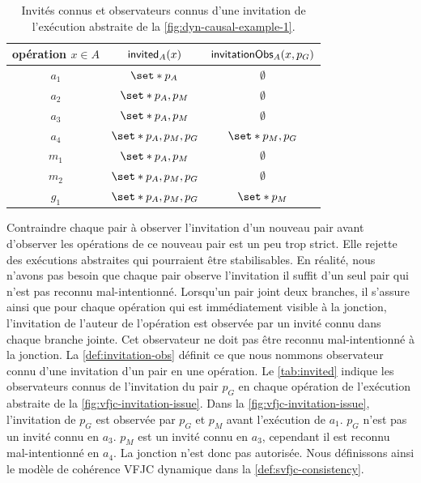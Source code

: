 \begin{table}[htb]
    \centering
    \begin{tabular}{ccc}
        opération $x \in A$ & $\operatorname{\mathsf{invited}}_A(x)$ & $\operatorname{\mathsf{invitationObs}}_A(x,p_G)$ \\
        \toprule
        $a_1$ & $\set*{p_A}$ & $\emptyset$ \\
        $a_2$ & $\set*{p_A, p_M}$ & $\emptyset$ \\
        $a_3$ & $\set*{p_A, p_M}$ & $\emptyset$ \\
        $a_4$ & $\set*{p_A, p_M,p_G}$ & $\set*{p_M,p_G}$\\
        $m_1$ & $\set*{p_A, p_M}$ & $\emptyset$ \\
        $m_2$ & $\set*{p_A, p_M,p_G}$ & $\emptyset$ \\
        $g_1$ & $\set*{p_A, p_M,p_G}$ & $\set*{p_M}$ \\
    \end{tabular}
    \caption[Invités connus et observateurs connus d'une invitation]{Invités connus et observateurs connus d'une invitation de l'exécution abstraite de la \autoref{fig:dyn-causal-example-1}.}\label{tab:invited}
\end{table}

Contraindre chaque pair à observer l'invitation d'un nouveau pair avant d'observer les opérations de ce nouveau pair est un peu trop strict.
Elle rejette des exécutions abstraites qui pourraient être stabilisables.
En réalité, nous n'avons pas besoin que chaque pair observe l'invitation il suffit d'un seul pair qui n'est pas reconnu mal-intentionné.
Lorsqu'un pair joint deux branches, il s'assure ainsi que pour chaque opération qui est immédiatement visible à la jonction, l'invitation de l'auteur de l'opération est observée par un invité connu dans chaque branche jointe.
Cet observateur ne doit pas être reconnu mal-intentionné à la jonction.
La \autoref{def:invitation-obs} définit ce que nous nommons observateur connu d'une invitation d'un pair en une opération.
Le \autoref{tab:invited} indique les observateurs connus de l'invitation du pair $p_G$ en chaque opération de l'exécution abstraite de la \autoref{fig:vfjc-invitation-issue}.
Dans la \autoref{fig:vfjc-invitation-issue}, l'invitation de $p_G$ est observée par $p_G$ et $p_M$ avant l'exécution de $a_1$.
$p_G$ n'est pas un invité connu en $a_3$.
$p_M$ est un invité connu en $a_3$, cependant il est reconnu mal-intentionné en $a_4$.
La jonction n'est donc pas autorisée.
Nous définissons ainsi le modèle de cohérence \ac{VFJC} dynamique dans la \autoref{def:svfjc-consistency}.

